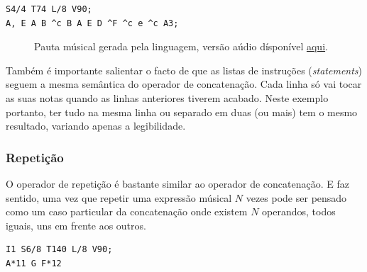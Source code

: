 \begin{lstlisting}[caption={Excerto da música \textit{Wet Hands} de C418},label=lst:ops-concat,belowcaptionskip=-\medskipamount]
S4/4 T74 L/8 V90;
A, E A B ^c B A E D ^F ^c e ^c A3;
\end{lstlisting}


\begin{figure}[ht]
  \centering
  {%
  \setlength{\fboxsep}{0pt}%
  \setlength{\fboxrule}{0pt}%
  }%
  \caption{Pauta músical gerada pela linguagem\protect\footnotemark, versão aúdio dísponível \href{https://drive.google.com/open?id=1TP4lcul81s8iMCUFmD3HKnSpeftCzKT0}{\underline{aqui}}\protect\footnotemark.}
  \label{fig:ops-concat}
\end{figure}


Também é importante salientar o facto de que as listas de instruções (\textit{statements}) seguem a mesma semântica do operador de concatenação. Cada linha só vai tocar as suas notas quando as linhas anteriores tiverem acabado. Neste exemplo portanto, ter tudo na mesma linha ou separado em duas (ou mais) tem o mesmo resultado, variando apenas a legibilidade.

\subsubsection{Repetição}
O operador de repetição é bastante similar ao operador de concatenação. E faz sentido, uma vez que repetir uma expressão músical $N$ vezes pode ser pensado como um caso particular da concatenação onde existem $N$ operandos, todos iguais, uns em frente aos outros.

\begin{lstlisting}[caption={Excerto do começo do tema principal de Westworld, por Ramin Djawadi},label=lst:ops-repetition,belowcaptionskip=-\medskipamount]
I1 S6/8 T140 L/8 V90;
A*11 G F*12
\end{lstlisting}

